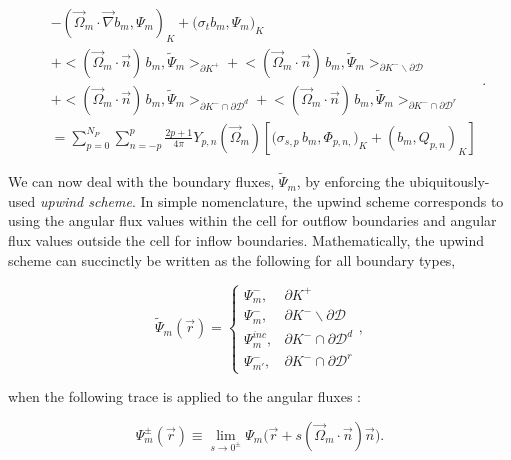 \begin{equation}
\label{eq::Sn_DGFEM_trans_eq_cellK_diff_faces}
\begin{aligned}
&- \left( \vec{\Omega}_m \cdot  \vec{\nabla} b_m, \Psi_{m} \right)_{K}   + \Big(  \sigma_{t} b_m ,   \Psi_{m} \Big)_{K}  \\
&+  \Big< ( \vec{\Omega}_m \cdot \vec{n} ) \, b_m, \tilde{\Psi}_m  \Big>_{\partial K^+}  + \Big< ( \vec{\Omega}_m \cdot \vec{n} ) \, b_m, \tilde{\Psi}_m  \Big>_{\partial K^- \backslash \partial \mathcal{D}} \\
  &+ \Big< ( \vec{\Omega}_m \cdot \vec{n} ) \, b_m, \tilde{\Psi}_m  \Big>_{\partial K^- \cap \partial \mathcal{D}^d}  + \Big< ( \vec{\Omega}_m \cdot \vec{n} ) \, b_m, \tilde{\Psi}_m  \Big>_{\partial K^- \cap \partial \mathcal{D}^r}  \\
&= \sum_{p=0}^{N_P} \sum_{n=-p}^{p} \frac{2p + 1}{4 \pi}  Y_{p,n} (  \vec{\Omega}_m ) \left[ \Big( \sigma_{s,p} \, b_m,  \Phi_{p,n,} \Big)_{K}  + \left(  b_m ,   Q_{p,n} \right)_{K} \right]
\end{aligned} .
\end{equation}

We can now deal with the boundary fluxes, $\tilde{\Psi}_m$, by enforcing the ubiquitously-used {\em upwind scheme}. In simple nomenclature, the upwind scheme corresponds to using the angular flux values within the cell for outflow boundaries and angular flux values outside the cell for inflow boundaries. Mathematically, the upwind scheme can succinctly be written as the following for all boundary types,

\begin{equation}
\label{eq::Sn_upwind_cases}
\tilde{\Psi}_m (\vec{r}) = \begin{cases}
\Psi_m^{-} , & \partial K^+ \\
\Psi_m^{-}, & \partial K^- \backslash \partial \mathcal{D} \\
\Psi_m^{inc}, & \partial K^- \cap \partial \mathcal{D}^d \\
\Psi_{m'}^{-}, & \partial K^- \cap \partial \mathcal{D}^r
\end{cases} ,
\end{equation}

\noindent when the following trace is applied to the angular fluxes :

\begin{equation}
\label{eq::Sn_ang_flux_trace}
\Psi_m^{\pm} (\vec{r}) \equiv \lim_{s \rightarrow 0^{\pm}} \Psi_m \Big( \vec{r} + s (\vec{\Omega}_m \cdot \vec{n}) \vec{n} \Big) .
\end{equation}

